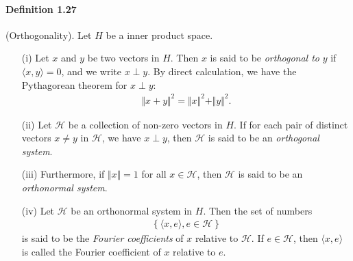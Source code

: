 \documentclass{article}
\begin{document}
\paragraph{Definition 1.27\label{def:1.27}} (Orthogonality). Let $H$ be a inner product space.
\begin{itemize}
	\item[(i)] Let $x$ and $y$ be two vectors in $H$. Then $x$ is said to be \textit{orthogonal to} $y$ if $\langle x,y\rangle = 0$, and we write $x\perp y$. By direct calculation, we have the Pythagorean theorem for $x\perp y$:
	\begin{align*}
		\Vert x+y\Vert^2 = \Vert x\Vert^2 + \Vert y\Vert^2.
	\end{align*}
	\item[(ii)] Let $\mathscr{H}$ be a collection of non-zero vectors in $H$. If for each pair of distinct vectors $x\neq y$ in $\mathscr{H}$, we have $x\perp y$, then $\mathscr{H}$ is said to be an \textit{orthogonal system}.
	\item[(iii)] Furthermore, if $\Vert x\Vert=1$ for all $x\in\mathscr{H}$, then $\mathscr{H}$ is said to be an \textit{orthonormal system}.
	\item[(iv)] Let $\mathscr{H}$ be an orthonormal system in $H$. Then the set of numbers
	\begin{align*}
		\left\{\langle x,e\rangle,e\in\mathscr{H}\right\}
	\end{align*}
    is said to be the \textit{Fourier coefficients} of $x$ relative to $\mathscr{H}$. If $e\in\mathscr{H}$, then $\langle x,e\rangle$ is called the Fourier coefficient of $x$ relative to $e$.
\end{itemize}
\end{document}
